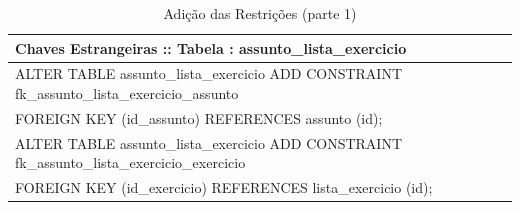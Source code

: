 \documentclass[graduacao,brazil]{ThesisPUC}
\begin{document}
\begin{table}[H]
{\begin{tabular}{|l|}
    Chaves Estrangeiras :: Tabela : assunto\_lista\_exercicio                                                                                                                                                                                                                                                                                             \\ \hline
    ALTER TABLE assunto\_lista\_exercicio ADD CONSTRAINT fk\_assunto\_lista\_exercicio\_assunto \\FOREIGN KEY (id\_assunto) REFERENCES assunto (id);\\ALTER TABLE assunto\_lista\_exercicio ADD CONSTRAINT fk\_assunto\_lista\_exercicio\_exercicio \\FOREIGN KEY (id\_exercicio) REFERENCES lista\_exercicio (id);                                           \\ \hline
    \end{tabular}
    }
    \caption {Adi\c{c}\~{a}o das Restri\c{c}\~{o}es (parte 1)}
\end{table}

\end{document}
